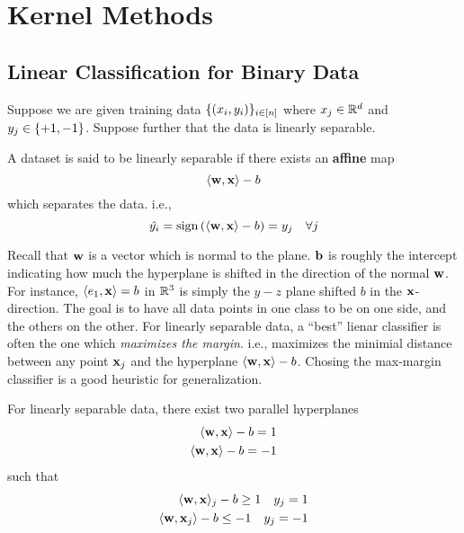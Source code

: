 \section{Kernel Methods}
    \subsection{Linear Classification for Binary Data}
        Suppose we are given training data $\{ (x_i, y_i) \}_{i \in [n]}$ where
        $x_j \in \mathbb{R}^d$ and $y_j \in \{ +1, -1 \}$. Suppose further that the data is
        linearly separable.

        \begin{defn}
            A dataset is said to be linearly separable if there exists an {\bf affine} map
            $$\langle {\bf w}, {\bf x} \rangle - b$$ which separates the data. i.e.,
            $$ \hat{y_i} = {\rm sign}\left( \langle {\bf w}, {\bf x} \rangle - b \right) = y_j \quad \forall j $$
        \end{defn}
        Recall that $\mathbf{w}$ is a vector which is normal to the plane. ${\bf b}$ is roughly the intercept
        indicating how much the hyperplane is shifted in the direction of the normal $\mathbf{w}$. For instance,
        $\langle e_1, \mathbf{x} \rangle = b$ in $\mathbb{R}^3$ is simply the $y-z$ plane shifted $b$ in the $\mathbf{x}$-direction.
        The goal is to have all data points in one class to be on one side, and the others on the other. For linearly
        separable data, a ``best'' lienar classifier is often the one which {\em maximizes the margin}.
        i.e., maximizes the minimial distance between any point ${\bf x}_j$ and the hyperplane $\langle {\bf w}, {\bf x} \rangle - b$.
        Chosing the max-margin classifier is a good heuristic for generalization.

        For linearly separable data, there exist two parallel hyperplanes
        \begin{align*}
            \langle \mathbf{w}, \mathbf{x} \rangle - b = 1 \\
            \langle \mathbf{w}, \mathbf{x} \rangle - b = -1
        \end{align*}
        such that
        \begin{align*}
            \langle \mathbf{w}, \mathbf{x} \rangle_j - b \geq 1 \quad y_j = 1 \\
            \langle \mathbf{w}, \mathbf{x}_j \rangle -b \leq -1 \quad y_j = -1
        \end{align*}

